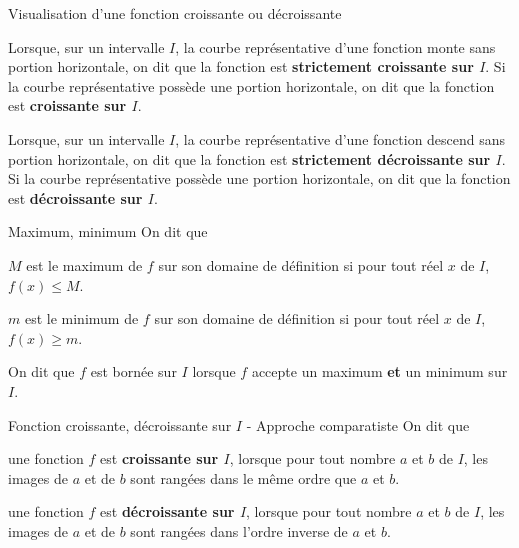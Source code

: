 \begin{DefT}{Visualisation d'une fonction croissante ou décroissante}
\begin{description}[leftmargin=*]
\item[•] Lorsque, sur un intervalle $I$, la courbe représentative d'une fonction monte sans portion horizontale, on dit que la fonction est \textbf{strictement croissante sur $I$}. Si la courbe représentative possède une portion horizontale, on dit que la fonction est \textbf{croissante sur $I$}.
\item[•] Lorsque, sur un intervalle $I$, la courbe représentative d'une fonction descend sans portion horizontale, on dit que la fonction est \textbf{strictement décroissante sur $I$}. Si la courbe représentative possède une portion horizontale, on dit que la fonction est \textbf{décroissante sur $I$}.
\end{description}
\end{DefT}




\begin{DefT}{Maximum, minimum}
On dit que
\begin{description}[leftmargin=*]
\item[•] $M$ est le maximum de $f$ sur son domaine de définition si pour tout réel $x$ de $I$, $f(x) \leq M$. 
\item[•] $m$ est le minimum de $f$ sur son domaine de définition si pour tout réel $x$ de $I$, $f(x) \geq m$. 
\end{description} 
On dit que $f$ est bornée  sur $I$ lorsque $f$ accepte un maximum \textbf{et} un minimum sur $I$.
\end{DefT}


 

\begin{DefT}{Fonction croissante, décroissante sur $I$ - Approche comparatiste}
On dit que
\begin{description}[leftmargin=*]
\item[•] une fonction $f$ est \textbf{croissante sur $I$}, lorsque pour tout nombre $a$ et $b$ de $I$, les images de $a$ et de $b$ sont rangées dans le même ordre que $a$ et $b$.
\item[•] une fonction $f$ est \textbf{décroissante sur $I$}, lorsque pour tout nombre $a$ et $b$ de $I$,  les images de $a$ et de $b$ sont rangées dans l'ordre inverse de $a$ et $b$.
\end{description} 
\end{DefT}

